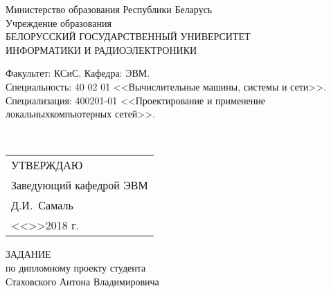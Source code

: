 {
  \thispagestyle{empty}
    \setlength{\parindent}{0em}

    \newcommand{\lineunderscore}{\uline{\hspace*{\fill}}}
    \newcommand\tab[1][1cm]{\hspace*{#1}}

    \begin{center}
	    Министерство образования Республики Беларусь\\[1em]
	    Учреждение образования\\
	    БЕЛОРУССКИЙ ГОСУДАРСТВЕННЫЙ УНИВЕРСИТЕТ \\
	    ИНФОРМАТИКИ И РАДИОЭЛЕКТРОНИКИ\\[1em]
    \end{center}

    \begin{minipage}{\textwidth}
		    Факультет: КСиС. Кафедра: ЭВМ. \\
		    Специальность: 40 02 01 <<Вычислительные машины, системы и сети>>.\\
		    Специализация: 400201-01 <<Проектирование и применение локальных\break компьютерных сетей>>.
    \end{minipage}\\[1em]

    \begin{minipage}{\textwidth}
	    \begin{flushright}
		    \begin{tabular}{p{}}
			    УТВЕРЖДАЮ \\
			    Заведующий кафедрой ЭВМ \\
			    \underline{\hspace*{5em}}Д.И.~Самаль \\
			    <<\underline{\hspace*{4ex}}>>\underline{\hspace*{6em}}2018 г.
		    \end{tabular}
	    \end{flushright}
    \end{minipage}

    \begin{center}
	    ЗАДАНИЕ \\
	    по дипломному проекту студента \\
	    Стаховского Антона Владимировича
    \end{center}

}
